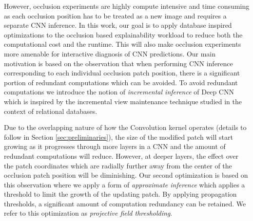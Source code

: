 
However, occlusion experiments are highly compute intensive and time consuming as each occlusion position has to be treated as a new image and requires a separate CNN inference.
In this work, our goal is to apply database inspired optimizations to the occlusion based explainability workload to reduce both the computational cost and the runtime.
This will also make occlusion experiments more amenable for interactive diagnosis of CNN predictions.
Our main motivation is based on the observation that when performing CNN inference corresponding to each individual occlusion patch position, there is a significant portion of redundant computations which can be avoided.
To avoid redundant computations we introduce the notion of \textit{incremental inference} of Deep CNN which is inspired by the incremental view maintenance technique studied in the context of relational databases.

Due to the overlapping nature of how the Convolution kernel operates (details to follow in Section \ref{sec:preliminaries}), the size of the modified patch will start growing as it progresses through more layers in a CNN and the amount of redundant computations will reduce.
However, at deeper layers, the effect over the patch coordinates which are radially further away from the center of the occlusion patch position will be diminishing.
Our second optimization is based on this observation where we apply a form of \textit{approximate inference} which applies a threshold to limit the growth of the updating patch. 
By applying propagation thresholds, a significant amount of computation redundancy can be retained.
We refer to this optimization as \textit{projective field thresholding}.

